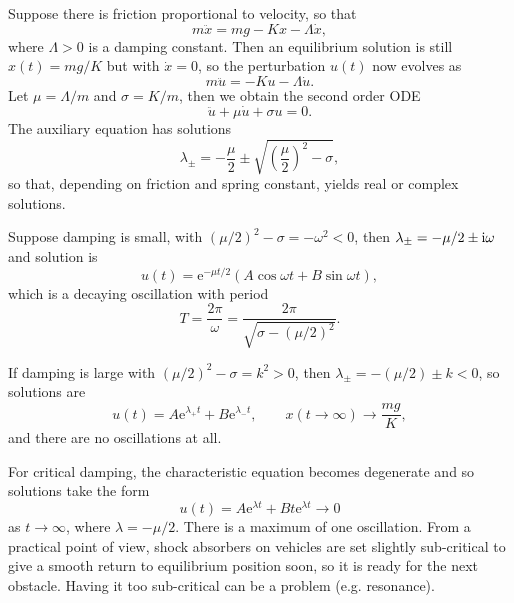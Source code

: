 \documentclass[letter-paper]{tufte-book}
\newcommand{\ex}{\mathrm{e}}
\newcommand{\zi}{{\rm i}}
\begin{document}
Suppose there is friction proportional to velocity, so that
\begin{equation*}
  m\ddot{x} = mg - Kx - \Lambda \dot{x},
\end{equation*}
where $\Lambda > 0$ is a damping constant. Then an equilibrium solution is still
$x(t) = mg/K$ but with $\dot{x} = 0$, so the perturbation $u(t)$ now evolves as
\begin{equation*}
  m\ddot{u} = -Ku - \Lambda \dot{u}.
\end{equation*}
Let $\mu = \Lambda / m$ and $\sigma = K / m$, then we obtain the second order
ODE
\begin{equation*}
  \ddot{u} + \mu\dot{u} + \sigma u = 0.
\end{equation*}
The auxiliary equation has solutions
\begin{equation*}
  \lambda_\pm = -\frac{\mu}{2} \pm \sqrt{\left(\frac{\mu}{2}\right)^2 - \sigma},
\end{equation*}
so that, depending on friction and spring constant, yields real or complex
solutions.

Suppose damping is small, with $(\mu/2)^2 - \sigma = -\omega^2 < 0$, then
$\lambda_\pm = -\mu/2 \pm \zi \omega$and solution is
\begin{equation*}
  u(t) = \ex^{-\mu t/2}(A \cos\omega t + B \sin \omega t),
\end{equation*}
which is a decaying oscillation with period
\begin{equation*}
  T = \frac{2\pi}{\omega} = \frac{2\pi}{\sqrt{\sigma - (\mu/2)^2}}.
\end{equation*}

If damping is large with $(\mu/2)^2 - \sigma = k^2 > 0$, then $\lambda_\pm =
-(\mu/2) \pm k < 0$, so solutions are
\begin{equation*}
  u(t) = A\ex^{\lambda_+ t} + B\ex^{\lambda_- t}, \qquad
  x(t\to\infty) \to \frac{mg}{K},
\end{equation*}
and there are no oscillations at all.

For critical damping, the characteristic equation becomes degenerate and so
solutions take the form
\begin{equation*}
  u(t) = A\ex^{\lambda t} + B t \ex^{\lambda t} \to 0
\end{equation*}
as $t\to\infty$, where $\lambda = -\mu/2$. There is a maximum of one
oscillation. From a practical point of view, shock absorbers on vehicles are set
slightly sub-critical to give a smooth return to equilibrium position soon, so
it is ready for the next obstacle. Having it too sub-critical can be a problem
(e.g. resonance).
\end{document}
